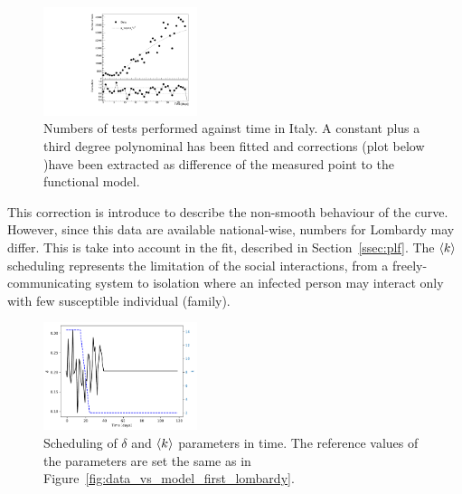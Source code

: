 \begin{figure}
\centering
  \includegraphics[width=0.4\textwidth]{imgs/Covid/TamponsCorrections.pdf}
  \caption{Numbers of tests performed against time in Italy. A constant plus a third degree polynominal has been fitted and corrections (plot below )have been extracted as difference of the measured point to the functional model.}
  \label{fig:tests_vs_time}
\end{figure}

This correction is introduce to describe the non-smooth behaviour of the curve. However, since this data are available national-wise, numbers for Lombardy may differ. This is take into account in the fit, described in Section~\ref{ssec:plf}. The $\braket{k}$ scheduling represents the limitation of the social interactions, from a freely-communicating system to isolation where an infected person may interact only with  few susceptible individual (family).\\

\begin{figure}
\centering
\includegraphics[width=0.4\textwidth]{imgs/Covid/Scheduling_regular.pdf} 
  \caption{Scheduling of $\delta$ and $\braket{k}$ parameters in time. The reference values of the parameters are set the same as in Figure~\ref{fig:data_vs_model_first_lombardy}.}
  \label{fig:scheduling}
\end{figure}

